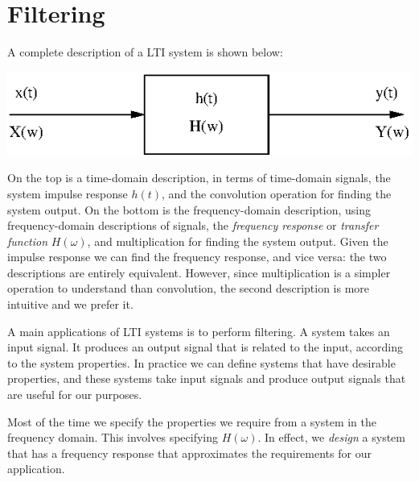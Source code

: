 \documentclass[10pt]{beamer}
\newcommand{\conv}{\ast}
\begin{document}
\pagestyle{fancy}
\fancyhead{}
\renewcommand{\headrulewidth}{0pt}
\fancyfoot[C]{\thesection-\thepage}

\begin{frame}
\titlepage
\end{frame}

\setcounter{section}{5}
\section{Filtering}

A complete description of a LTI system is shown below:
\begin{center}
  \psfrag{y(t)}{\scriptsize $y(t) = h(t) \conv x(t)$}
  \includegraphics{simpleltisystemtf}
\end{center}
On the top is a time-domain description, in terms of time-domain signals, the system impulse response $h(t)$, and the convolution operation for finding the system output.  On the bottom is the frequency-domain description, using frequency-domain descriptions of signals, the {\em frequency response} or {\em transfer function} $H(\omega)$, and multiplication for finding the system output.  Given the impulse response we can find the frequency response, and vice versa:  the two descriptions are entirely equivalent.  However, since multiplication is a simpler operation to understand than convolution, the second description is more intuitive and we prefer it.

A main applications of LTI systems is to perform filtering.  A system takes an input signal.  It produces an output signal that is related to the input, according to the system properties.  In practice we can define systems that have desirable properties, and these systems take input signals and produce output signals that are useful for our purposes.

Most of the time we specify the properties we require from a system in the frequency domain.  This involves specifying $H(\omega)$.  In effect, we {\em design} a system that has a frequency response that approximates the requirements for our application.
\end{document}
